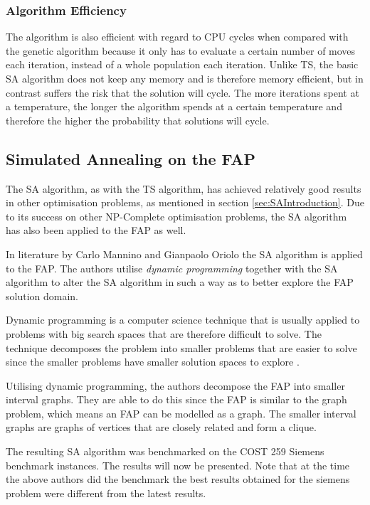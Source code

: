 \subsubsection{Algorithm Efficiency}
The algorithm is also efficient with regard to CPU cycles when compared with the genetic algorithm because it only has to evaluate a certain number of moves each iteration, instead of a whole population each iteration. Unlike TS, the basic SA algorithm does not keep any memory and is therefore memory efficient, but in contrast suffers the risk that the solution will cycle. The more iterations spent at a temperature, the longer the algorithm spends at a certain temperature and therefore the higher the probability that solutions will cycle.
\subsection{Simulated Annealing on the FAP}
The SA algorithm, as with the TS algorithm, has achieved relatively good results in other optimisation problems, as mentioned in section \ref{sec:SAIntroduction}. Due to its success on other NP-Complete optimisation problems, the SA algorithm has also been applied to the FAP as well.

In literature by Carlo Mannino and Gianpaolo Oriolo\cite{SolvingSuperIntervalGraphs} the SA algorithm is applied to the FAP. The authors utilise \emph{dynamic programming} together with the SA algorithm to alter the SA algorithm in such a way as to better explore the FAP solution domain.

Dynamic programming is a computer science technique that is usually applied to problems with big search spaces that are therefore difficult to solve\cite{AIModernApproach}. The technique decomposes the problem into smaller problems that are easier to solve since the smaller problems have smaller solution spaces to explore \cite{AIModernApproach,IntroMathProgramming}.

Utilising dynamic programming, the authors decompose the FAP into smaller interval graphs. They are able to do this since the FAP is similar to the graph problem, which means an FAP can be modelled as a graph\cite{ProblemDecompMIFAP}. The smaller interval graphs are graphs of vertices that are closely related and form a clique\cite{ProblemDecompMIFAP}.

The resulting SA algorithm was benchmarked on the COST 259 Siemens benchmark instances. The results will now be presented. Note that at the time the above authors did the benchmark the best results obtained for the siemens problem were different from the latest results.
